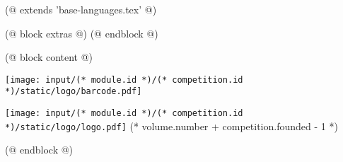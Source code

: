 (@ extends 'base-languages.tex' @)

(@ block extras @)
(@ endblock @)

(@ block content @)
    \pagestyle{empty}
    \begin{center}
        \null
        \vfill
        \texttt{[image: input/(* module.id *)/(* competition.id *)/static/logo/barcode.pdf]}
    \end{center}
    \newpage        
    \begin{center}
        \vspace*{20mm}
        \texttt{[image: input/(* module.id *)/(* competition.id *)/static/logo/logo.pdf]}
        \vfill
        \fontsize{60}{25}\selectfont
        (* volume.number + competition.founded - 1 *)
    \end{center}
(@ endblock @)

